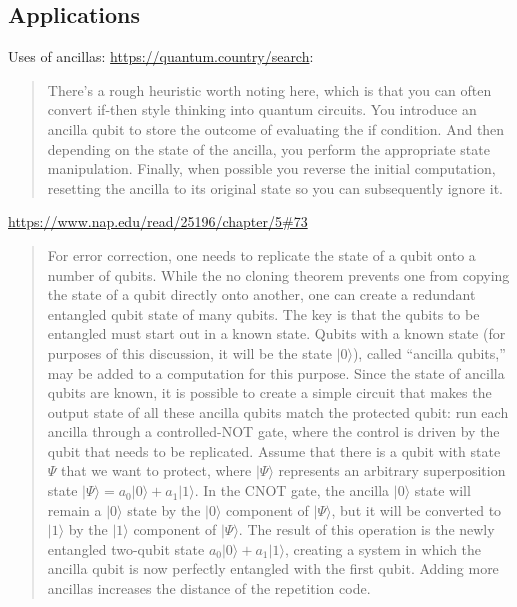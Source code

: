 \documentclass[sigplan,10pt,review,anonymous]{acmart}
\newcommand{\ket}[1]{|#1\rangle}
\begin{document}
\subsection{Applications}
 
Uses of ancillas:
\url{https://quantum.country/search}:

\begin{quote}
  There’s a rough heuristic worth noting here, which is that you can
  often convert if-then style thinking into quantum circuits. You
  introduce an ancilla qubit to store the outcome of evaluating the if
  condition. And then depending on the state of the ancilla, you
  perform the appropriate state manipulation. Finally, when possible
  you reverse the initial computation, resetting the ancilla to its
  original state so you can subsequently ignore it.
\end{quote}

\url{https://www.nap.edu/read/25196/chapter/5#73}
\begin{quote}
  For error correction, one needs to replicate the state of a qubit
  onto a number of qubits. While the no cloning theorem prevents one
  from copying the state of a qubit directly onto another, one can
  create a redundant entangled qubit state of many qubits. The key is
  that the qubits to be entangled must start out in a known
  state. Qubits with a known state (for purposes of this discussion,
  it will be the state $\ket{0}$), called ``ancilla qubits,'' may be
  added to a computation for this purpose. Since the state of ancilla
  qubits are known, it is possible to create a simple circuit that
  makes the output state of all these ancilla qubits match the
  protected qubit: run each ancilla through a controlled-NOT gate,
  where the control is driven by the qubit that needs to be
  replicated. Assume that there is a qubit with state $\Psi$ that we
  want to protect, where $\ket{\Psi}$ represents an arbitrary
  superposition state $\ket{\Psi} = a_0 \ket{0} + a_1 \ket{1}$. In the
  CNOT gate, the ancilla $\ket{0}$ state will remain a $\ket{0}$ state
  by the $\ket{0}$ component of $\ket{\Psi}$, but it will be converted
  to $\ket{1}$ by the $\ket{1}$ component of $\ket{\Psi}$. The result
  of this operation is the newly entangled two-qubit state
  $a_0 \ket{0} + a_1 \ket{1}$, creating a system in which the ancilla
  qubit is now perfectly entangled with the first qubit. Adding more
  ancillas increases the distance of the repetition code.  \end{quote}
\end{document}
